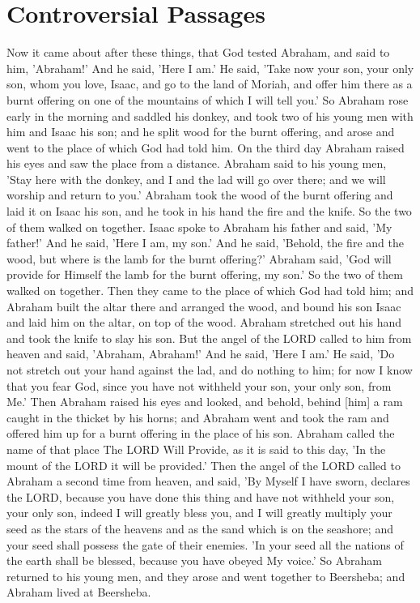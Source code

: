 \chapter{Controversial Passages}

\begin{scripture}[Genesis 22:1-19]
    Now it came about after these things, that God tested Abraham, and said to him, 'Abraham!' And he said, 'Here I am.'
    He said, 'Take now your son, your only son, whom you love, Isaac, and go to the land of Moriah, and offer him there as a burnt offering on one of the mountains of which I will tell you.'
    So Abraham rose early in the morning and saddled his donkey, and took two of his young men with him and Isaac his son; and he split wood for the burnt offering, and arose and went to the place of which God had told him.
    On the third day Abraham raised his eyes and saw the place from a distance.
    Abraham said to his young men, 'Stay here with the donkey, and I and the lad will go over there; and we will worship and return to you.'
    Abraham took the wood of the burnt offering and laid it on Isaac his son, and he took in his hand the fire and the knife. So the two of them walked on together.
    Isaac spoke to Abraham his father and said, 'My father!' And he said, 'Here I am, my son.' And he said, 'Behold, the fire and the wood, but where is the lamb for the burnt offering?'
    Abraham said, 'God will provide for Himself the lamb for the burnt offering, my son.' So the two of them walked on together.
    Then they came to the place of which God had told him; and Abraham built the altar there and arranged the wood, and bound his son Isaac and laid him on the altar, on top of the wood.
    Abraham stretched out his hand and took the knife to slay his son.
    But the angel of the LORD called to him from heaven and said, 'Abraham, Abraham!' And he said, 'Here I am.'
    He said, 'Do not stretch out your hand against the lad, and do nothing to him; for now I know that you fear God, since you have not withheld your son, your only son, from Me.'
    Then Abraham raised his eyes and looked, and behold, behind [him] a ram caught in the thicket by his horns; and Abraham went and took the ram and offered him up for a burnt offering in the place of his son.
    Abraham called the name of that place The LORD Will Provide, as it is said to this day, 'In the mount of the LORD it will be provided.'
    Then the angel of the LORD called to Abraham a second time from heaven,
    and said, 'By Myself I have sworn, declares the LORD, because you have done this thing and have not withheld your son, your only son,
    indeed I will greatly bless you, and I will greatly multiply your seed as the stars of the heavens and as the sand which is on the seashore; and your seed shall possess the gate of their enemies.
    'In your seed all the nations of the earth shall be blessed, because you have obeyed My voice.'
    So Abraham returned to his young men, and they arose and went together to Beersheba; and Abraham lived at Beersheba.
\end{scripture}


